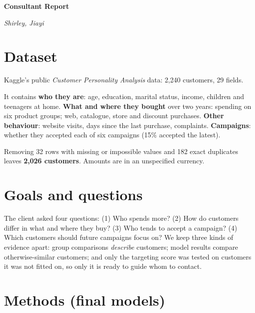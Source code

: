 \documentclass[10pt,letterpaper]{article}
\newcommand{\BodySize}{9.2pt}
\newcommand{\BodySkip}{10.8pt}
\begin{document}
\fontsize{\BodySize}{\BodySkip}\selectfont

{\Large\bfseries Consultant Report\par}
\vspace{1pt}
{\small\itshape Shirley, Jiayi}

\section*{Dataset}
Kaggle's public \emph{Customer Personality Analysis} data: 2,240 customers, 29 fields.

It contains \textbf{who they are}: age, education, marital status, income, children and teenagers at home. \textbf{What and where they bought} over two years: spending on six product groups; web, catalogue, store and discount purchases. \textbf{Other behaviour}: website visits, days since the last purchase, complaints. \textbf{Campaigns}: whether they accepted each of six campaigns (15\% accepted the latest).

Removing 32 rows with missing or impossible values and 182 exact duplicates leaves \textbf{2,026 customers}. Amounts are in an unspecified currency.

\section*{Goals and questions}
The client asked four questions:
 (1) Who spends more? (2) How do customers differ in what and where they buy? (3) Who tends to accept a campaign? (4) Which customers should future campaigns focus on?
We keep three kinds of evidence apart: group comparisons \emph{describe} customers; model results compare otherwise-similar customers; and only the targeting score was tested on customers it was not fitted on, so only it is ready to guide whom to contact.

\section*{Methods (final models)}
\end{document}
